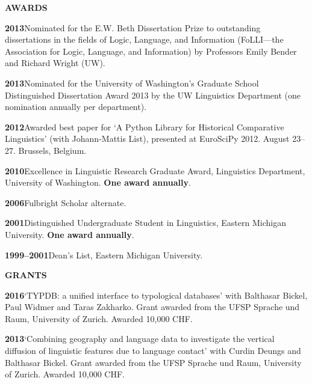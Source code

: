 \documentclass[11pt]{article}
\newcommand{\hangpara}{
 \setlength{\parindent}{0in} %
 \hangindent=0.42in %
}
\begin{document}
\vskip 20pt
\begin{flushleft}
{\bf AWARDS}
\end{flushleft}

\hangpara
{\bf 2013}\hspace{1ex}Nominated for the E.W. Beth Dissertation Prize to outstanding dissertations in the fields of Logic, Language, and Information (FoLLI---the Association for Logic, Language, and Information) by Professors Emily Bender and Richard Wright (UW).

\vskip 6pt
\hangpara
{\bf 2013}\hspace{1ex}Nominated for the University of Washington's Graduate School Distinguished Dissertation Award 2013 by the UW Linguistics Department (one nomination annually per department).

\vskip 6pt
\hangpara
{\bf 2012}\hspace{1ex}Awarded best paper for `A Python Library for Historical Comparative Linguistics' (with Johann-Mattis List), presented at EuroSciPy 2012. August 23--27. Brussels, Belgium.

\vskip 6pt
\hangpara
{\bf 2010}\hspace{1ex}Excellence in Linguistic Research Graduate Award, Linguistics Department, University of Washington. \textbf{One award annually}.

\vskip 6pt
\hangpara
{\bf 2006}\hspace{1ex}Fulbright Scholar alternate.

\vskip 6pt
\hangpara
{\bf 2001}\hspace{1ex}Distinguished Undergraduate Student in Linguistics, Eastern Michigan University. \textbf{One award annually}.

\vskip 6pt
\hangpara
{\bf 1999--2001}\hspace{1ex}Dean's List, Eastern Michigan University.


\vskip 20pt
\begin{flushleft}
{\bf GRANTS}
\end{flushleft}



\hangpara
{\bf 2016}\hspace{1ex}`TYPDB: a unified interface to typological databases' with Balthasar Bickel, Paul Widmer and Taras Zakharko. Grant awarded from the UFSP Sprache und Raum, University of Zurich. Awarded 10,000 CHF.

\vskip 6pt
\hangpara
{\bf 2013}\hspace{1ex}`Combining geography and language data to investigate the vertical diffusion of linguistic features due to language contact' with Curdin Deungs and Balthasar Bickel. Grant awarded from the UFSP Sprache und Raum, University of Zurich. Awarded 10,000 CHF.
\end{document}
